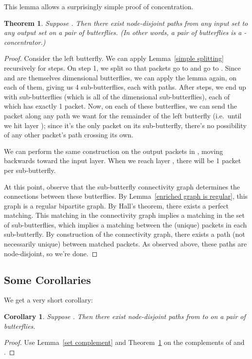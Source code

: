 \documentclass[12pt]{article}
\newtheorem{theorem}{Theorem}
\newtheorem{corollary}{Corollary}
\begin{document}
This lemma allows a surprisingly simple proof of  concentration.
\begin{theorem} \label{powers of two}
Suppose .  Then there exist node-disjoint paths
from any input set  to any output set  on a pair of butterflies.
(In other words, a pair of butterflies is a -concentrator.)
\end{theorem}
\begin{proof}
Consider the left butterfly.
We can apply Lemma~\ref{simple splitting} recursively for  steps.  On
step 1, we split  so that  packets go to  and 
 go to .  Since  and  are themselves  
dimensional butterflies, we can apply the lemma again, on each
of them, giving us 4 sub-butterflies, each with  
paths.  After  steps, we end up with  sub-butterflies
(which is all of the  dimensional sub-butterflies),
each of which has exactly 1 packet.  Now, on each of these butterflies,
we can send the packet along any path we want for the remainder
of the left butterfly (i.e.\ until we hit layer ); since it's the only 
packet on its sub-butterfly, there's no possibility of any other 
packet's path crossing its own.

We can perform the same construction on the output packets in ,
moving backwards toward the input layer.  When we reach layer ,
there will be 1 packet per sub-butterfly.

At this point, observe that the sub-butterfly connectivity graph 
determines the connections between these butterflies.
By Lemma~\ref{enriched graph is regular},
this graph is a regular bipartite graph.
By Hall's theorem, there exists a 
perfect matching.  
This matching in the connectivity graph implies a matching in the
set of sub-butterflies, which implies a matching between the (unique)
packets in each sub-butterfly.  By construction of the connectivity
graph, there exists a path (not necessarily unique) between matched
packets.  As observed above, these paths are node-disjoint,
so we're done. \end{proof}

\subsection{Some Corollaries}

We get a very short corollary:
\begin{corollary}
Suppose .  Then there exist node-disjoint paths
from  to  on a pair of butterflies.
\end{corollary}
\begin{proof}
Use Lemma~\ref{set complement} and Theorem~\ref{powers of two} on 
the complements of  and . \end{proof}
\end{document}
